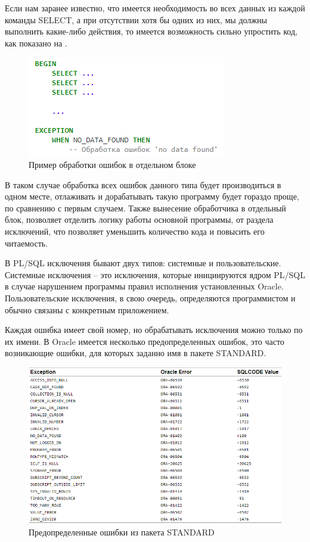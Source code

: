 Если нам заранее известно, что имеется необходимость во всех данных из каждой команды SELECT, а при отсутствии хотя бы одних из них, мы должны выполнить какие-либо действия, то имеется возможность сильно упростить код, как показано на .

\begin{figure}[ht!] 
	\center
	\includegraphics [scale=1] {my_folder/img/C1_code2.png}
	\caption{Пример обработки ошибок в отдельном блоке} 
	\label{fig:c1_code2}  
\end{figure}
\FloatBarrier

В таком случае обработка всех ошибок данного типа будет производиться в одном месте, отлаживать и дорабатывать такую программу будет гораздо проще, по сравнению с первым случаем. 
Также вынесение обработчика в отдельный блок, позволяет отделить логику работы основной программы, от раздела исключений, что позволяет уменьшить количество кода и повысить его читаемость.

В PL/SQL исключения бывают двух типов: системные и пользовательские. Системные исключения – это исключения, которые инициируются ядром PL/SQL в случае нарушением программы правил исполнения установленных Oracle. Пользовательские исключения, в свою очередь, определяются программистом и обычно связаны с конкретным приложением. 

Каждая ошибка имеет свой номер, но обрабатывать исключения можно только по их имени. В Oracle имеется несколько предопределенных ошибок, это часто возникающие ошибки, для которых заданно имя в пакете STANDARD. 

\begin{figure}[ht!] 
	\center
	\includegraphics [scale=0.75] {my_folder/img/C1_tab1_predef_exceptions}
	\caption{Предопределенные ошибки из пакета STANDARD} 
	\label{fig:C1_tab1_predef}  
\end{figure}
\FloatBarrier

